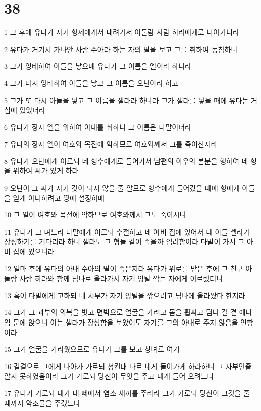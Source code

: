 \chapter{38}

\par 1 그 후에 유다가 자기 형제에게서 내려가서 아둘람 사람 히라에게로 나아가니라
\par 2 유다가 거기서 가나안 사람 수아라 하는 자의 딸을 보고 그를 취하여 동침하니
\par 3 그가 잉태하여 아들을 낳으매 유다가 그 이름을 엘이라 하니라
\par 4 그가 다시 잉태하여 아들을 낳고 그 이름을 오난이라 하고
\par 5 그가 또 다시 아들을 낳고 그 이름을 셀라라 하니라 그가 셀라를 낳을 때에 유다는 거십에 있었더라
\par 6 유다가 장자 엘을 위하여 아내를 취하니 그 이름은 다말이더라
\par 7 유다의 장자 엘이 여호와 목전에 악하므로 여호와께서 그를 죽이신지라
\par 8 유다가 오난에게 이르되 네 형수에게로 들어가서 남편의 아우의 본분을 행하여 네 형을 위하여 씨가 있게 하라
\par 9 오난이 그 씨가 자기 것이 되지 않을 줄 알므로 형수에게 들어갔을 때에 형에게 아들을 얻게 아니하려고 땅에 설정하매
\par 10 그 일이 여호와 목전에 악하므로 여호와께서 그도 죽이시니
\par 11 유다가 그 며느리 다말에게 이르되 수절하고 네 아비 집에 있어서 내 아들 셀라가 장성하기를 기다리라 하니 셀라도 그 형들 같이 죽을까 염려함이라 다말이 가서 그 아비 집에 있으니라
\par 12 얼마 후에 유다의 아내 수아의 딸이 죽은지라 유다가 위로를 받은 후에 그 친구 아둘람 사람 히라와 함께 딤나로 올라가서 자기 양털 깍는 자에게 이르렀더니
\par 13 혹이 다말에게 고하되 네 시부가 자기 양털을 깎으려고 딤나에 올라왔다 한지라
\par 14 그가 그 과부의 의복을 벗고 면박으로 얼굴을 가리고 몸을 휩싸고 딤나 길 곁 에나임 문에 앉으니 이는 셀라가 장성함을 보았어도 자기를 그의 아내로 주지 않음을 인함이라
\par 15 그가 얼굴을 가리웠으므로 유다가 그를 보고 창녀로 여겨
\par 16 길곁으로 그에게 나아가 가로되 청컨대 나로 네게 들어가게 하라하니 그 자부인줄 알지 못하였음이라 그가 가로되 당신이 무엇을 주고 내게 들어 오려느냐
\par 17 유다가 가로되 내가 내 떼에서 염소 새끼를 주리라 그가 가로되 당신이 그것을 줄 때까지 약조물을 주겠느냐

